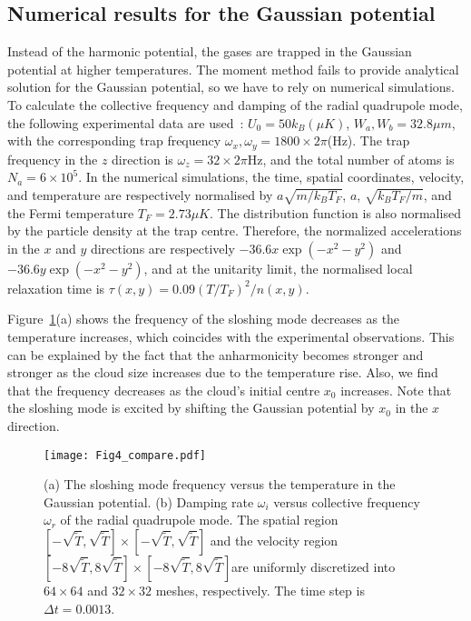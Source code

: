 \subsection{Numerical results for the Gaussian potential}

Instead of the harmonic potential, the gases are trapped in the Gaussian potential at higher temperatures. The moment method fails to provide analytical solution for the Gaussian potential, so we have to rely on numerical simulations. To calculate the collective frequency and damping of the radial quadrupole mode, the following experimental data are used~\cite{Riedl2008}: $U_0=50k_B(\mu K)$, $W_a,W_b=32.8\mu{m}$, with the corresponding trap frequency $\omega_x,\omega_y=1800\times2\pi$(Hz). The trap frequency in the $z$ direction is $\omega_z=32\times2\pi$Hz, and the total number of atoms is $N_a=6\times10^5$. In the numerical simulations, the time, spatial coordinates, velocity, and temperature are respectively normalised by $a\sqrt{m/k_BT_F}$, $a$, $\sqrt{k_BT_F/m}$, and the Fermi temperature $T_F=2.73\mu K$. The distribution function is also normalised by the particle density at the trap centre. Therefore, the normalized accelerations in the $x$ and $y$ directions are respectively $-36.6x\exp(-x^2-y^2)$ and $-36.6y\exp(-x^2-y^2)$, and at the unitarity limit, the normalised local relaxation time is $\tau(x,y)=0.09(T/T_F)^2/n(x,y)$.


Figure~\ref{gauss}(a) shows the frequency of the sloshing mode decreases as the temperature increases, which coincides with the experimental observations. This can be explained by the fact that the anharmonicity becomes stronger and stronger as the cloud size increases due to the temperature rise. Also, we find that the frequency decreases as the cloud's initial centre $x_0$ increases. Note that the sloshing mode is excited by shifting the Gaussian potential by $x_0$ in the $x$ direction.



\begin{figure}[t]
\center
\texttt{[image: Fig4\_compare.pdf]}
\caption[(a) The sloshing mode frequency versus the temperature in the Gaussian potential. (b) Damping rate $\omega_i$ versus collective frequency $\omega_r$ of the radial quadrupole mode.]
{(a) The sloshing mode frequency versus the temperature in the Gaussian potential. (b) Damping rate $\omega_i$ versus collective frequency $\omega_r$ of the radial quadrupole mode. The spatial region $[-\sqrt{\widetilde{T}},\sqrt{\widetilde{T}}]\times[-\sqrt{\widetilde{T}},\sqrt{\widetilde{T}}]$ and the velocity region $[-8\sqrt{\widetilde{T}},8\sqrt{\widetilde{T}}]\times[-8\sqrt{\widetilde{T}},8\sqrt{\widetilde{T}}]$are uniformly discretized into $64\times64$ and $32\times32$ meshes, respectively. The time step is $\Delta t=0.0013$.}
\label{gauss}
\end{figure}


